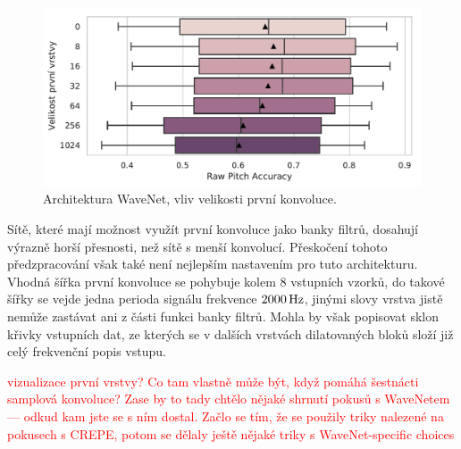 \begin{figure}[h]\centering
    \includegraphics[scale=0.6]{../img/figures/wavenet_first_layer}
\caption{Architektura WaveNet, vliv velikosti první konvoluce.}\label{obr:wavenet_first_layer}
\end{figure}

Sítě, které mají možnost využít první konvoluce jako banky filtrů, dosahují výrazně horší přesnosti, než sítě s menší konvolucí. Přeskočení tohoto předzpracování však také není nejlepším nastavením pro tuto architekturu. Vhodná šířka první konvoluce se pohybuje kolem 8 vstupních vzorků, do takové šířky se vejde jedna perioda signálu frekvence $2000\,\rm Hz$, jinými slovy vrstva jistě nemůže zastávat ani z části funkci banky filtrů. Mohla by však popisovat sklon křivky vstupních dat, ze kterých se v dalších vrstvách dilatovaných bloků složí již celý frekvenční popis vstupu.

\textcolor{red}{vizualizace první vrstvy? Co tam vlastně může být, když pomáhá šestnácti samplová konvoluce?}
\textcolor{red}{Zase by to tady chtělo nějaké shrnutí pokusů s WaveNetem — odkud kam jste se s ním dostal. Začlo se tím, že se použily triky nalezené na pokusech s CREPE, potom se dělaly ještě nějaké triky s WaveNet-specific choices}




